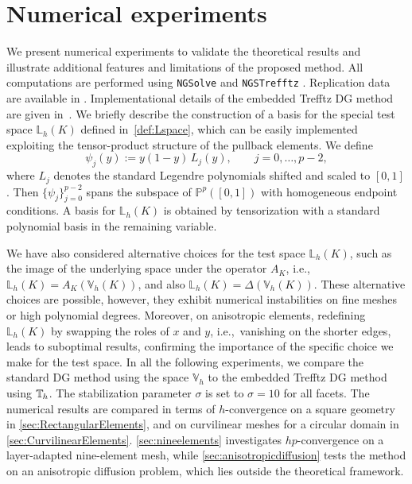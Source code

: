 \documentclass[a4paper,twoside,10pt]{article}
\newcommand{\LKh}{\mathbb{L}_h(K)}
\numberwithin{equation}{section}
\newcommand{\Vh}{\mathbb{V}_{\! h}}
\newcommand{\ITh}{\mathbb{T}_{\mspace{-1.5mu} h}}
\begin{document}
\section{Numerical experiments}\label{sect::numericalexperiments}
We present numerical experiments to validate the theoretical results and illustrate additional features and limitations of the proposed method.
All computations are performed using \texttt{NGSolve} \cite{ngsolve} and \texttt{NGSTrefftz} \cite{ngstrefftz}. 
Replication data are available in \cite{gomez_macias_2026_20322919}.
Implementational details of the embedded Trefftz DG method are given in~\cite{LS_IJMNE_2023}.
We briefly describe the construction of a basis for the special test space $\LKh$ defined in~\eqref{def:Lspace}, which can be easily implemented exploiting the tensor-product structure of the pullback elements. 
We define
\begin{equation*}
\psi_j(y):=y(1-y)\,L_j(y),\qquad j=0,\dots,p-2,
\end{equation*}
where $L_j$ denotes the standard Legendre polynomials shifted and scaled to  $[0,1]$.
Then $\{\psi_j\}_{j=0}^{p-2}$ spans the subspace of $\mathbb{P}^p([0,1])$ with homogeneous endpoint conditions. 
A basis for $\LKh$ is obtained by tensorization with a standard polynomial 
basis in the remaining variable.

We have also considered alternative choices for the test space $\LKh$, such as the image of the underlying space under the operator $A_K$, i.e., $\LKh = A_K(\Vh(K))$, and also $\LKh = \Delta(\Vh(K))$.
These alternative choices are possible, however, they exhibit numerical instabilities on fine meshes or high polynomial degrees.
Moreover, on anisotropic elements, redefining $\LKh$ by swapping the roles of $x$ and $y$, i.e.,\ vanishing on the shorter edges, leads to suboptimal results, confirming the importance of the specific choice we make for
the test space.
In all the following experiments, we compare the standard DG method using the space $\Vh$ to the embedded Trefftz DG method using $\ITh$.
The stabilization parameter $\sigma$ is set to $\sigma=10$ for all 
facets.
The numerical results are compared in terms of $h$-convergence on a square geometry 
in \cref{sec:RectangularElements}, and on curvilinear meshes 
for a circular domain in \cref{sec:CurvilinearElements}.  
\cref{sec:nineelements} investigates $hp$-convergence on a layer-adapted nine-element mesh, while \cref{sec:anisotropicdiffusion} tests the method on an anisotropic diffusion problem, which lies outside the theoretical framework.
\end{document}
